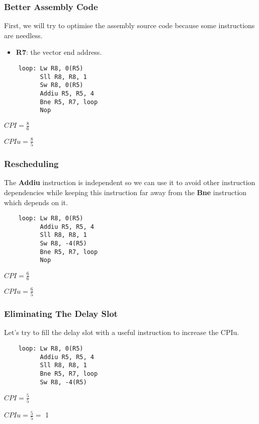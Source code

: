 
\begin{frame}[containsverbatim]
  \frametitle{Better Assembly Code}

  First, we will try to optimise the assembly source code because
  some instructions are needless.

  \begin{itemize}
    \item
      \textbf{R7}: the vector end address.
  \end{itemize}

  \begin{verbatim}
    loop: Lw R8, 0(R5)
          Sll R8, R8, 1
          Sw R8, 0(R5)
          Addiu R5, R5, 4
          Bne R5, R7, loop
          Nop
  \end{verbatim}

  \-

  $CPI = \frac{8}{6}$

  $CPIu = \frac{8}{5}$
\end{frame}


\begin{frame}[containsverbatim]
  \frametitle{Rescheduling}

  The \textbf{Addiu} instruction is independent so we can use it to
  avoid other instruction dependencies while keeping this instruction
  far away from the \textbf{Bne} instruction which depends on it.

  \begin{verbatim}
    loop: Lw R8, 0(R5)
          Addiu R5, R5, 4
          Sll R8, R8, 1
          Sw R8, -4(R5)
          Bne R5, R7, loop
          Nop
  \end{verbatim}

  \-

  $CPI = \frac{6}{6}$

  $CPIu = \frac{6}{5}$
\end{frame}


\begin{frame}[containsverbatim]
  \frametitle{Eliminating The Delay Slot}

  Let's try to fill the delay slot with a useful instruction to
  increase the CPIu.

  \begin{verbatim}
    loop: Lw R8, 0(R5)
          Addiu R5, R5, 4
          Sll R8, R8, 1
          Bne R5, R7, loop
          Sw R8, -4(R5)
  \end{verbatim}

  \-

  $CPI = \frac{5}{5}$

  $CPIu = \frac{5}{5} = $ \alert{1}
\end{frame}

